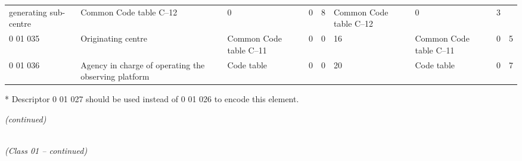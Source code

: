 \begin{longtable}[]{@{}lllllllll@{}}
\begin{minipage}[t]{0.08\columnwidth}
generating sub-centre\strut
\end{minipage} & \begin{minipage}[t]{0.08\columnwidth}\raggedright
Common Code table C--12\strut
\end{minipage} & \begin{minipage}[t]{0.08\columnwidth}\raggedright
0\strut
\end{minipage} & \begin{minipage}[t]{0.08\columnwidth}\raggedright
0\strut
\end{minipage} & \begin{minipage}[t]{0.08\columnwidth}\raggedright
8\strut
\end{minipage} & \begin{minipage}[t]{0.08\columnwidth}\raggedright
Common Code table C--12\strut
\end{minipage} & \begin{minipage}[t]{0.08\columnwidth}\raggedright
0\strut
\end{minipage} & \begin{minipage}[t]{0.08\columnwidth}\raggedright
3\strut
\end{minipage}\tabularnewline
0 01 035 & Originating centre & Common Code table C--11 & 0 & 0 & 16 & Common Code table C--11 & 0 & 5\tabularnewline
0 01 036 & Agency in charge of operating the observing platform & Code table & 0 & 0 & 20 & Code table & 0 & 7\tabularnewline
\bottomrule
\end{longtable}

* Descriptor 0 01 027 should be used instead of 0 01 026 to encode this element.

\emph{(continued)}

\emph{\\
(Class 01 -- continued)}

